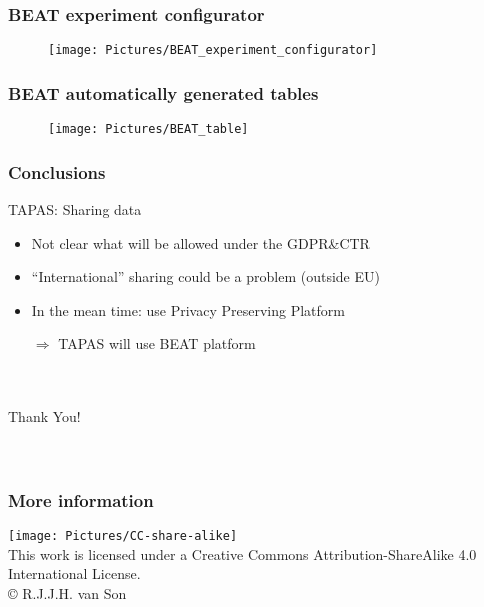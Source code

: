 \documentclass[xcolor=dvipsnames]{beamer}
\newcommand{\YEAR}{\the\year}
\begin{document}
\begin{frame}
	\frametitle{BEAT experiment configurator}
		
	\begin{center}
	\begin{figure}[l]
     \texttt{[image: Pictures/BEAT\_experiment\_configurator]}
	\end{figure}
	\end{center}
\end{frame}

\begin{frame}
	\frametitle{BEAT automatically generated tables}
		
	\begin{center}
	\begin{figure}[l]
     \texttt{[image: Pictures/BEAT\_table]}
	\end{figure}
	\end{center}
\end{frame}

\begin{frame}
	\frametitle{Conclusions}
	
	\begin{block}{TAPAS: Sharing data}
	\begin{itemize}
	\item Not clear what will be allowed under the GDPR\&CTR 
	\item ``International'' sharing could be a problem (outside EU)
	\item In the mean time: use Privacy Preserving Platform
	\item[$\Rightarrow$] TAPAS will use BEAT platform
	\end{itemize}
	\end{block}	
	
\end{frame}

\begin{frame}
	\begin{center}
	~\\~\\
	{\Huge Thank You!}\\
	~\\~\\
	\end{center}
\end{frame}


\begin{frame}[allowframebreaks]
        \frametitle{More information}

\begin{scriptsize}

\end{scriptsize}

\vskip 0.5cm
\begin{center}
\texttt{[image: Pictures/CC-share-alike]}\\
{\small This work is licensed under a Creative Commons Attribution-ShareAlike 4.0 International License.}\\
\copyright {\YEAR}  R.J.J.H. van Son
\end{center}

\end{frame}
\end{document}
